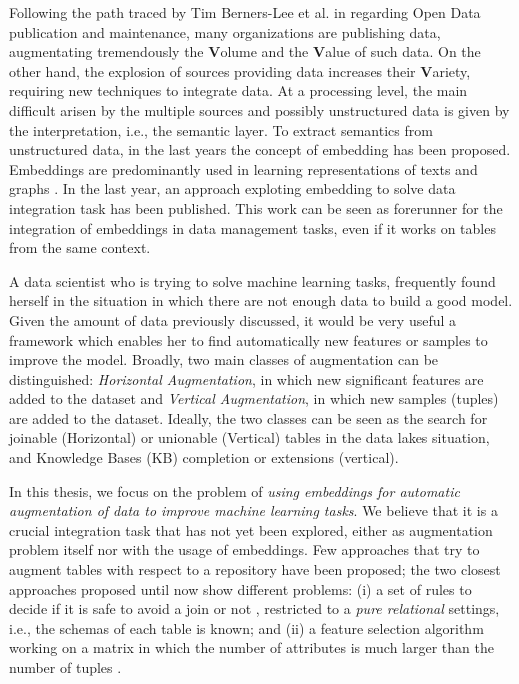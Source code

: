 Following the path traced by Tim Berners-Lee et al. in \cite{bizer2009linked} regarding Open Data publication and maintenance, many organizations are publishing data, augmentating tremendously the \textbf{V}olume and the \textbf{V}alue of such data. On the other hand, the explosion of sources providing data increases their \textbf{V}ariety, requiring new techniques to integrate data.
At a processing level, the main difficult arisen by the multiple sources and possibly unstructured data is given by the interpretation, i.e., the semantic layer. To extract semantics from unstructured data, in the last years the concept of embedding has been proposed. Embeddings are predominantly used in learning representations of texts \cite{mikolov2013efficient} and graphs \cite{nickel2017poincare}. In the last year, an approach exploting embedding to solve data integration task \cite{cappuzzo2020creating} has been published. This work can be seen as forerunner for the integration of embeddings in data management tasks, even if it works on tables from the same context.

A data scientist who is trying to solve machine learning tasks, frequently found herself in the situation in which there are not enough data to build a good model. Given the amount of data previously discussed, it would be very useful a framework which enables her to find automatically new features or samples to improve the model. Broadly, two main classes of augmentation can be distinguished: \textit{Horizontal Augmentation}, in which new significant features are added to the dataset and \textit{Vertical Augmentation}, in which new samples (tuples) are added to the dataset. Ideally, the two classes can be seen as the search for joinable (Horizontal) or unionable (Vertical) tables in the data lakes situation, and Knowledge Bases (KB) completion or extensions (vertical).

In this thesis, we focus on the problem of \textit{using embeddings for automatic augmentation of data to improve machine learning tasks}. We believe that it is a crucial integration task that has not yet been explored, either as augmentation problem itself nor with the usage of embeddings. Few approaches that try to augment tables with respect to a repository have been proposed; the two closest approaches proposed until now show different problems: (i) a set of rules to decide if it is safe to avoid a join or not \cite{kumar2016join}, restricted to a \textit{pure relational} settings, i.e., the schemas of each table is known; and (ii) a feature selection algorithm working on a matrix in which the number of attributes is much larger than the number of tuples \cite{chepurko2020arda}. 

